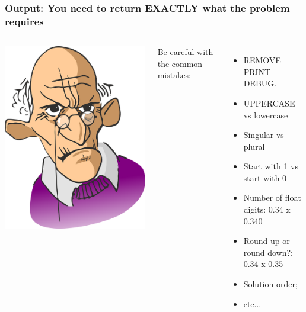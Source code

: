 \begin{frame}
  \frametitle{Output: You need to return EXACTLY what the problem requires}
  \begin{columns}
  \includegraphics[width=1\textwidth]{../img/angryclient}

  Be careful with the common mistakes:\medskip
  \begin{itemize}
    \item REMOVE PRINT DEBUG.\medskip

    \item UPPERCASE vs lowercase
    \item Singular vs plural
    \item Start with 1 vs start with 0
    \medskip

    \item Number of float digits: 0.34 x 0.340
    \item Round up or round down?: 0.34 x 0.35
    \medskip

    \item Solution order;\medskip

    \item etc...
  \end{itemize}
  \end{columns}
\end{frame}

